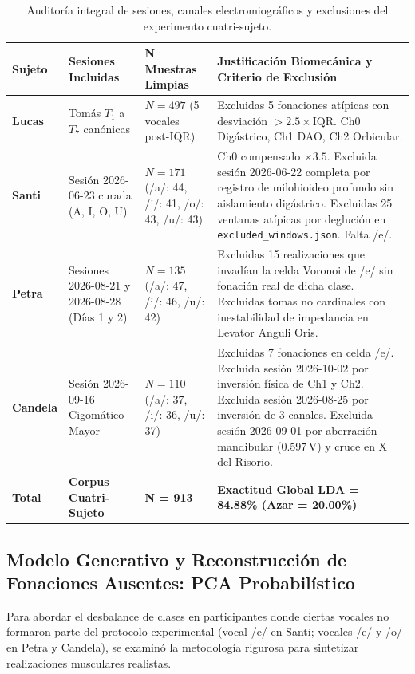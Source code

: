 \documentclass[11pt,a4paper,openany]{book}
\theoremstyle{definition}
\begin{document}
\begin{table}[H]
\centering
\small
\begin{tabular}{p{2.2cm}p{3.2cm}p{2.8cm}p{6.0cm}}
\toprule
\textbf{Sujeto} & \textbf{Sesiones Incluidas} & \textbf{N Muestras Limpias} & \textbf{Justificación Biomecánica y Criterio de Exclusión} \\
\midrule
\textbf{Lucas} & Tomás $T_1$ a $T_7$ canónicas & $N = 497$ (5 vocales post-IQR) & Excluidas 5 fonaciones atípicas con desviación $> 2.5 \times \text{IQR}$. Ch0 Digástrico, Ch1 DAO, Ch2 Orbicular. \\
\midrule
\textbf{Santi} & Sesión 2026-06-23 curada (A, I, O, U) & $N = 171$ (/a/: 44, /i/: 41, /o/: 43, /u/: 43) & Ch0 compensado $\times 3.5$. Excluida sesión 2026-06-22 completa por registro de milohioideo profundo sin aislamiento digástrico. Excluidas 25 ventanas atípicas por deglución en \texttt{excluded\_windows.json}. Falta /e/. \\
\midrule
\textbf{Petra} & Sesiones 2026-08-21 y 2026-08-28 (Días 1 y 2) & $N = 135$ (/a/: 47, /i/: 46, /u/: 42) & Excluidas 15 realizaciones que invadían la celda Voronoi de /e/ sin fonación real de dicha clase. Excluidas tomas no cardinales con inestabilidad de impedancia en Levator Anguli Oris. \\
\midrule
\textbf{Candela} & Sesión 2026-09-16 Cigomático Mayor & $N = 110$ (/a/: 37, /i/: 36, /u/: 37) & Excluidas 7 fonaciones en celda /e/. Excluida sesión 2026-10-02 por inversión física de Ch1 y Ch2. Excluida sesión 2026-08-25 por inversión de 3 canales. Excluida sesión 2026-09-01 por aberración mandibular ($0.597\,\text{V}$) y cruce en X del Risorio. \\
\midrule
\textbf{Total} & \textbf{Corpus Cuatri-Sujeto} & \textbf{N = 913} & \textbf{Exactitud Global LDA = 84.88\% (Azar = 20.00\%)} \\
\bottomrule
\end{tabular}
\caption{Auditoría integral de sesiones, canales electromiográficos y exclusiones del experimento cuatri-sujeto.}
\label{tab:auditoria_mediciones_cuatrisujeto}
\end{table}

\subsection{Modelo Generativo y Reconstrucción de Fonaciones Ausentes: PCA Probabilístico}
\label{subsec:ppca_reconstruccion_fonaciones}

Para abordar el desbalance de clases en participantes donde ciertas vocales no formaron parte del protocolo experimental (vocal /e/ en Santi; vocales /e/ y /o/ en Petra y Candela), se examinó la metodología rigurosa para sintetizar realizaciones musculares realistas.
\end{document}
